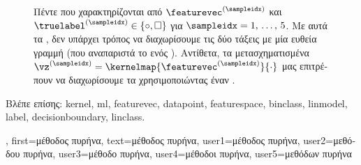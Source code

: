 {{\begin{figure}[H]
\begin{center}
		\end{center}
		{
		\caption{\foreignlanguage{greek}{Πέντε}  \foreignlanguage{greek}{που χαρακτηρίζονται από} 
			 $\featurevec^{(\sampleidx)}$ \foreignlanguage{greek}{και} 
			 $\truelabel^{(\sampleidx)} \in \{ \circ, \square \}$ \foreignlanguage{greek}{για $\sampleidx=1, \,\ldots, \,5$. 
			Με αυτά τα} , \foreignlanguage{greek}{δεν υπάρχει τρόπος να διαχωρίσουμε τις δύο τάξεις  
			με μία ευθεία γραμμή (που αναπαριστά το}  \foreignlanguage{greek}{ενός} ). 
			\foreignlanguage{greek}{Αντίθετα, τα μετασχηματισμένα}  
			$\vz^{(\sampleidx)} = \kernelmap{\featurevec^{(\sampleidx)}}{\cdot}$ 
			\foreignlanguage{greek}{μας επιτρέπουν να διαχωρίσουμε τα}  \foreignlanguage{greek}{χρησιμοποιώντας 
			έναν} .  \label{fig_linsep_kernel_dict}} }
		\end{figure}
		\foreignlanguage{greek}{Βλέπε επίσης:} \gls{kernel}, \gls{ml}, \gls{featurevec}, \gls{datapoint}, \gls{featurespace}, \gls{binclass}, 
		\gls{linmodel}, \gls{label}, \gls{decisionboundary}, \gls{linclass}.},
	first={\foreignlanguage{greek}{μέθοδος πυρήνα}},
	text={\foreignlanguage{greek}{μέθοδος πυρήνα}},
	user1={\foreignlanguage{greek}{μέθοδος πυρήνα}}, %
	user2={\foreignlanguage{greek}{μεθόδου πυρήνα}}, %
	user3={\foreignlanguage{greek}{μέθοδο πυρήνα}}, %
	user4={\foreignlanguage{greek}{μέθοδοι πυρήνα}}, %
	user5={\foreignlanguage{greek}{μεθόδων πυρήνα}} %
}

